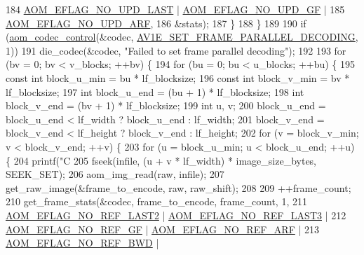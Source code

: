 \begin{DoxyCodeInclude}
{{184                           \hyperlink{group__aom__encoder_ga7a55a46970c074b761319c5c46d87b6e}{AOM\_EFLAG\_NO\_UPD\_LAST} | 
      \hyperlink{group__aom__encoder_gaa81cc31f95fd463f51a158050d267a36}{AOM\_EFLAG\_NO\_UPD\_GF} |
185                           \hyperlink{group__aom__encoder_ga469b4cf5ff76cb30de951e129c25a786}{AOM\_EFLAG\_NO\_UPD\_ARF},
186                       &stats);
187     \}
188   \}
189 
190   \textcolor{keywordflow}{if} (\hyperlink{group__codec_ga6da974f4eeaba1fa74106b28d0fe6ac5}{aom\_codec\_control}(&codec, 
      \hyperlink{group__aom__encoder_ggae78dde67a6d78f332e9bdba0dde42db5a465382b6bbca24467739c3c1b94e6483}{AV1E\_SET\_FRAME\_PARALLEL\_DECODING}, 1))
191     die\_codec(&codec, \textcolor{stringliteral}{"Failed to set frame parallel decoding"});
192 
193   \textcolor{keywordflow}{for} (bv = 0; bv < v\_blocks; ++bv) \{
194     \textcolor{keywordflow}{for} (bu = 0; bu < u\_blocks; ++bu) \{
195       \textcolor{keyword}{const} \textcolor{keywordtype}{int} block\_u\_min = bu * lf\_blocksize;
196       \textcolor{keyword}{const} \textcolor{keywordtype}{int} block\_v\_min = bv * lf\_blocksize;
197       \textcolor{keywordtype}{int} block\_u\_end = (bu + 1) * lf\_blocksize;
198       \textcolor{keywordtype}{int} block\_v\_end = (bv + 1) * lf\_blocksize;
199       \textcolor{keywordtype}{int} u, v;
200       block\_u\_end = block\_u\_end < lf\_width ? block\_u\_end : lf\_width;
201       block\_v\_end = block\_v\_end < lf\_height ? block\_v\_end : lf\_height;
202       \textcolor{keywordflow}{for} (v = block\_v\_min; v < block\_v\_end; ++v) \{
203         \textcolor{keywordflow}{for} (u = block\_u\_min; u < block\_u\_end; ++u) \{
204           printf(\textcolor{stringliteral}{"C%
205           fseek(infile, (u + v * lf\_width) * image\_size\_bytes, SEEK\_SET);
206           aom\_img\_read(raw, infile);
207           get\_raw\_image(&frame\_to\_encode, raw, raw\_shift);
208 
209           ++frame\_count;
210           get\_frame\_stats(&codec, frame\_to\_encode, frame\_count, 1,
211                           \hyperlink{group__aom__encoder_ga50c2560ca6670298cfc614ecae96a391}{AOM\_EFLAG\_NO\_REF\_LAST2} | 
      \hyperlink{group__aom__encoder_gaa4bc8ae2b977b73f0ef57ba428ca1d2c}{AOM\_EFLAG\_NO\_REF\_LAST3} |
212                               \hyperlink{group__aom__encoder_gaaef6fe76991abf87edd2f296eee999f8}{AOM\_EFLAG\_NO\_REF\_GF} | 
      \hyperlink{group__aom__encoder_ga9e2f989737d63ddf4e987a525d186a46}{AOM\_EFLAG\_NO\_REF\_ARF} |
213                               \hyperlink{group__aom__encoder_ga758649aa6cd9fefb15ad888489884a38}{AOM\_EFLAG\_NO\_REF\_BWD} | 
}}}
\end{DoxyCodeInclude}
